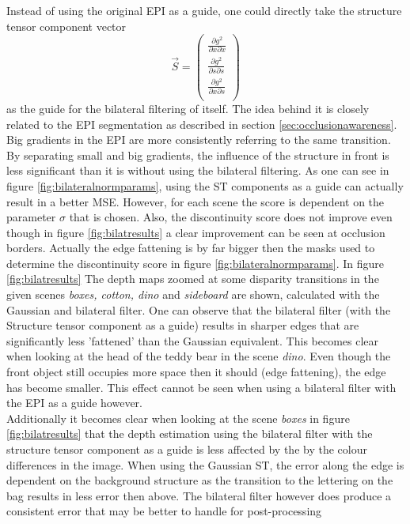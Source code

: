 \documentclass  [
  paper    = a4,
  BCOR     = 10mm,
  twoside,
  fontsize = 12pt,
  fleqn,
  toc      = bibnumbered,
  toc      = listofnumbered,
  numbers  = noendperiod,
  headings = normal,
  listof   = leveldown,
  version  = 3.03
]                                       {scrreprt}
\begin{document}
 Instead of using the original EPI as a guide, one could directly take the structure tensor component vector 
 \begin{equation}\label{key}
 \vec S = \left(\begin{matrix}
 \frac{\partial g^2}{\partial x \partial x} \\
 \frac{\partial g^2}{\partial s \partial s} \\
 \frac{\partial g^2}{\partial x \partial s} \\
 \end{matrix}\right)
 \end{equation}
 as the guide for the bilateral filtering of itself. The idea behind it is closely related to the EPI segmentation as described in section \ref{sec:occlusionawareness}. Big gradients in the EPI are more consistently referring to the same transition. By separating small and big gradients, the influence of the structure in front is less significant than it is without using the bilateral filtering. As one can see in figure \ref{fig:bilateralnormparams}, using the ST components as a guide can actually result in a better MSE. However, for each scene the score is dependent on the parameter $\sigma$ that is chosen. Also, the discontinuity score does not improve even though in figure \ref{fig:bilatresults} a clear improvement can be seen at occlusion borders. Actually the edge fattening is by far bigger then the masks used to determine the discontinuity score in figure \ref{fig:bilateralnormparams}. In figure \ref{fig:bilatresults} The depth maps zoomed at some disparity transitions in the given scenes \textit{boxes, cotton, dino} and \textit{sideboard} are shown, calculated with the Gaussian and bilateral filter. One can observe that the bilateral filter (with the Structure tensor component as a guide) results in sharper edges that are significantly less 'fattened' than the Gaussian equivalent. This becomes clear when looking at the head of the teddy bear in the scene \textit{dino}. Even though the front object still occupies more space then it should (edge fattening), the edge has become smaller. This effect cannot be seen when using a bilateral filter with the EPI as a guide however.\\
 Additionally it becomes clear when looking at the scene \textit{boxes} in figure \ref{fig:bilatresults} that the depth estimation using the bilateral filter with the structure tensor component as a guide is less affected by the by the colour differences in the image. When using the Gaussian ST, the error along the edge is dependent on the background structure as the transition to the lettering on the bag results in less error then above. The bilateral filter however does produce a consistent error that may be better to handle for post-processing
\end{document}
